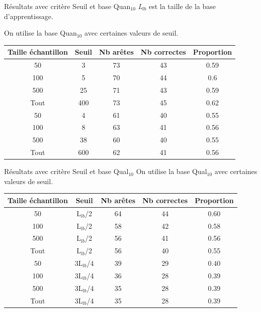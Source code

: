 \documentclass{beamer}
\begin{document}
\begin{frame}{Résultats avec critère Seuil et base Quan$_{10}$}
\emph{L$_{lb}$} est la taille de la base d'apprentissage. 


On utilise la base Quan$_{10}$ avec certaines valeurs de seuil.

\begin{tabular}{|c|c|c|c|c|}
   \hline
   Taille échantillon & Seuil & Nb arêtes & Nb correctes & Proportion\\
   \hline
   50 & 3 & 73 & 43 & 0.59  \\   
   \hline
   100 & 5 & 70 & 44 & 0.6  \\
   \hline
   500 & 25 & 71 & 43 & 0.59  \\
   \hline
   Tout & 400 & 73 & 45 & 0.62 \\
   \hline
   50 & 4 & 61 & 40 & 0.55  \\
   \hline
   100 & 8 & 63 & 41 & 0.56  \\
   \hline
   500 & 38 & 60 & 40 & 0.55  \\
   \hline
   Tout & 600 & 62 & 41 & 0.56 \\
   \hline
\end{tabular}


\end{frame}

\begin{frame}{Résultats avec critère Seuil et base Qual$_{10}$}
On utilise la base Qual$_{10}$ avec certaines valeurs de seuil.
\begin{tabular}{|c|c|c|c|c|}
   \hline
   Taille échantillon & Seuil & Nb arêtes & Nb correctes & Proportion\\
    \hline
   50 & L$_{lb}$/2 & 64 & 44 & 0.60  \\
   \hline
   100 & L$_{lb}$/2 & 58 & 42 & 0.58  \\
   \hline
   500 & L$_{lb}$/2 & 56 & 41 & 0.56  \\
   \hline
   Tout & L$_{lb}$/2 & 56 & 40 & 0.55 \\
   \hline
   50 & 3L$_{lb}$/4 & 39 & 29 & 0.40  \\
   \hline
   100 & 3L$_{lb}$/4 & 36 & 28 & 0.39  \\
   \hline
   500 & 3L$_{lb}$/4 & 35 & 28 & 0.39  \\
   \hline
   Tout & 3L$_{lb}$/4 & 35 & 28 & 0.39 \\
   \hline
\end{tabular}
\end{frame}
\end{document}
